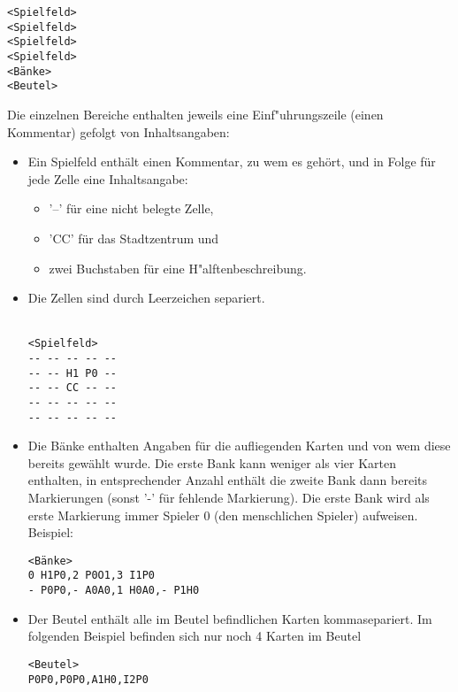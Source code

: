 \begin{addmargin}[50pt]{0pt}
\begin{samepage}
\verb|<Spielfeld>|
\\ \verb|<Spielfeld>|
\\ \verb|<Spielfeld>|
\\ \verb|<Spielfeld>|
\\ \verb|<Bänke>|
\\ \verb|<Beutel>|\\
\end{samepage}
\end{addmargin}

Die einzelnen Bereiche enthalten jeweils eine Einf"uhrungszeile (einen Kommentar) gefolgt von Inhaltsangaben:
\begin{itemize}
	\item Ein Spielfeld enthält einen Kommentar, zu wem es gehört, und in Folge für jede Zelle eine Inhaltsangabe:
	\begin{itemize}
		\item '--' für eine nicht belegte Zelle,
		\item 'CC' für das Stadtzentrum und
		\item zwei Buchstaben für eine H"alftenbeschreibung.
	\end{itemize}
	\item Die Zellen sind durch Leerzeichen separiert. \\ \newline {}\\
	\begin{addmargin}[50pt]{0pt}
	\verb|<Spielfeld>|
	\\ \verb|-- -- -- -- --|
	\\ \verb|-- -- H1 P0 --|
	\\ \verb|-- -- CC -- --|
	\\ \verb|-- -- -- -- --|
	\\ \verb|-- -- -- -- --|\\
	\end{addmargin}
	\item Die Bänke enthalten Angaben für die aufliegenden Karten und von wem diese bereits gewählt wurde. Die erste Bank kann weniger als vier Karten enthalten, in entsprechender Anzahl enthält die zweite Bank dann bereits Markierungen (sonst '-' für fehlende Markierung). Die erste Bank wird als erste Markierung immer Spieler 0 (den menschlichen Spieler) aufweisen. Beispiel:
	\begin{addmargin}[50pt]{0pt}
	\verb|<Bänke>|
  \\ \verb|0 H1P0,2 P0O1,3 I1P0|
  \\ \verb|- P0P0,- A0A0,1 H0A0,- P1H0|
  \end{addmargin}
  \item Der Beutel enthält alle im Beutel befindlichen Karten kommasepariert. Im folgenden Beispiel befinden sich nur noch 4 Karten im Beutel
  \begin{addmargin}[50pt]{0pt}
  \verb|<Beutel>|
  \\ \verb|P0P0,P0P0,A1H0,I2P0|
  \end{addmargin}
\end{itemize}
